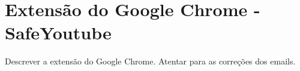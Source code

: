 \newpage
\section{Extensão do Google Chrome - SafeYoutube}

Descrever a extensão do Google Chrome. Atentar para as correções dos emails.
